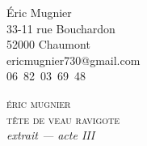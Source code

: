 \documentclass[11pt,a5paper,twoside,openright]{memoir}
\begin{document}
\pagestyle{empty}

\noindent
Éric Mugnier\\
33-11 rue Bouchardon\\
52000 Chaumont\\
ericmugnier730@gmail.com\\
06~82~03~69~48

\vspace{4\onelineskip}
\begin{center}
{\scshape\large éric mugnier}\\[2\onelineskip]
{\scshape\Large tête de veau ravigote}\\[1\onelineskip]
{\itshape extrait — acte III}
\end{center}

\cleardoublepage
\pagestyle{gallimard}


\end{document}
